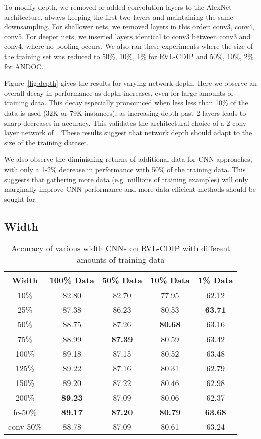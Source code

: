 \documentclass[10pt, conference, compsocconf]{IEEEtran}
\newcommand{\squeezeup}{\vspace{-2.5mm}}
\begin{document}
To modify depth, we removed or added convolution layers to the AlexNet architecture, always keeping the first two layers and maintaining the same downsampling.
For shallower nets, we removed layers in this order: conv3, conv4, conv5.
For deeper nets, we inserted layers identical to conv3 between conv3 and conv4, where no pooling occurs.
We also ran these experiments where the size of the training set was reduced to 50\%, 10\%, 1\% for RVL-CDIP and 50\%, 10\%, 2\% for ANDOC.

Figure~\ref{fig:depth} gives the results for varying network depth.
Here we observe an overall decay in performance as depth increases, even for large amounts of training data.
This decay especially pronounced when less less than 10\% of the data is used (32K or 79K instances), as increasing depth past 2 layers leads to sharp decreases in accuracy.
This validates the architectural choice of a 2-conv layer network of~\cite{kang14}.
These results suggest that network depth should adapt to the size of the training dataset.

We also observe the diminishing returns of additional data for CNN approaches, with only a 1-2\% decrease in performance with 50\% of the training data.
This suggests that gathering more data (e.g. millions of training examples) will only marginally improve CNN performance and more data efficient methods should be sought for. 


\subsection{Width}

\begin{table}

\centering
\begin{tabular}{c|c|c|c|c}
Width & 100\% Data & 50\% Data & 10\% Data & 1\% Data  \\
\hline
10\%     & 82.80          & 82.70          & 77.95          & 62.12 \\
25\%     & 87.38          & 86.23          & 80.53          & \textbf{63.71} \\
50\%     & 88.75          & 87.26          & \textbf{80.68} & 63.16 \\
75\%     & 88.99          & \textbf{87.39} & 80.59 & 63.42 \\
100\%    & 89.18 & 87.15          & 80.52          & 63.48 \\
125\%    & 89.22 & 87.16          & 80.31          & 62.79 \\
150\%    & 89.20 & 87.22          & 80.46          & 62.98 \\
200\%    & \textbf{89.23} & 87.09          & 80.06          & 62.37 \\
\hline
fc-50\%  & \textbf{89.17} & \textbf{87.20} & \textbf{80.79} & \textbf{63.68} \\
conv-50\%& 88.78          & 87.09          & 80.61          & 63.24 \\
\end{tabular}

\caption{Accuracy of various width CNNs on RVL-CDIP with different amounts of training data}
\label{tab:width}
\squeezeup
\squeezeup
\end{table}
\end{document}
